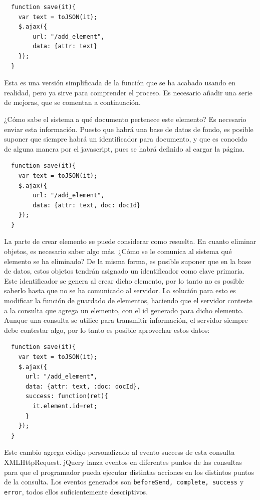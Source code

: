 \begin{verbatim}
  function save(it){
  	var text = toJSON(it);
  	$.ajax({
  		url: "/add_element",
  		data: {attr: text}
  	});
  }
\end{verbatim}

Esta es una versión simplificada de la función que se ha acabado usando en realidad, pero ya sirve para comprender el proceso. Es necesario añadir una serie de mejoras, que se comentan a continuación.

¿Cómo sabe el sistema a qué documento pertenece este elemento? Es necesario enviar esta información. Puesto que habrá una base de datos de fondo, es posible suponer que siempre habrá un identificador para documento, y que es conocido de alguna manera por el javascript, pues se habrá definido al cargar la página.

\begin{verbatim}
  function save(it){
  	var text = toJSON(it);
  	$.ajax({
  		url: "/add_element",
  		data: {attr: text, doc: docId}
  	});
  }
\end{verbatim}

La parte de crear elemento se puede considerar como resuelta. En cuanto eliminar objetos, es necesario saber algo más. ¿Cómo se le comunica al sistema qué elemento se ha eliminado? De la misma forma, es posible suponer que en la base de datos, estos objetos tendrán asignado un identificador como clave primaria. Este identificador se genera al crear dicho elemento, por lo tanto no es posible saberlo hasta que no se ha comunicado al servidor. La solución para esto es modificar la función de guardado de elementos, haciendo que el servidor conteste a la consulta que agrega un elemento, con el id generado para dicho elemento. Aunque una consulta se utilice para transmitir información, el servidor siempre debe contestar algo, por lo tanto es posible aprovechar estos datos:

\begin{verbatim}
  function save(it){
  	var text = toJSON(it);
  	$.ajax({
  	  url: "/add_element",
  	  data: {attr: text, :doc: docId},
  	  success: function(ret){
  	    it.element.id=ret;
  	  }
  	});
  }
\end{verbatim}

Este cambio agrega código personalizado al evento success de esta consulta XMLHttpRequest. jQuery lanza eventos en diferentes puntos de las consultas para que el programador pueda ejecutar distintas acciones en los distintos puntos de la consulta. Los eventos generados son \texttt{beforeSend, complete, success} y \texttt{error}, todos ellos suficientemente descriptivos.

